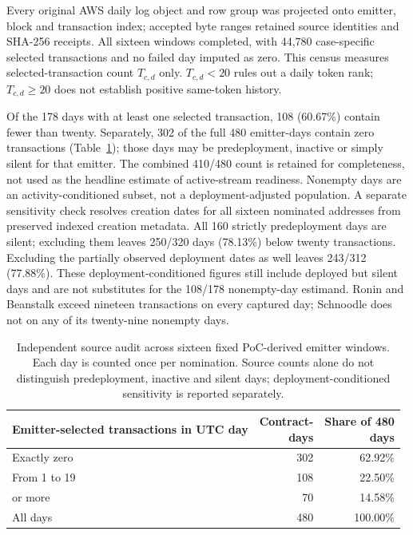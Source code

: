 \documentclass[preprint,12pt,authoryear]{elsarticle}
\begin{document}
Every original AWS daily log object and row group was projected onto emitter, block and transaction index; accepted byte ranges retained source identities and SHA-256 receipts. All sixteen windows completed, with 44,780 case-specific selected transactions and no failed day imputed as zero. This census measures selected-transaction count $T_{c,d}$ only. $T_{c,d}<20$ rules out a daily token rank; $T_{c,d}\geq20$ does not establish positive same-token history.

Of the 178 days with at least one selected transaction, 108 (60.67\%) contain fewer than twenty. Separately, 302 of the full 480 emitter-days contain zero transactions (Table~\ref{tab:newframe}); those days may be predeployment, inactive or simply silent for that emitter. The combined 410/480 count is retained for completeness, not used as the headline estimate of active-stream readiness. Nonempty days are an activity-conditioned subset, not a deployment-adjusted population. A separate sensitivity check resolves creation dates for all sixteen nominated addresses from preserved indexed creation metadata. All 160 strictly predeployment days are silent; excluding them leaves 250/320 days (78.13\%) below twenty transactions. Excluding the partially observed deployment dates as well leaves 243/312 (77.88\%). These deployment-conditioned figures still include deployed but silent days and are not substitutes for the 108/178 nonempty-day estimand. Ronin and Beanstalk exceed nineteen transactions on every captured day; Schnoodle does not on any of its twenty-nine nonempty days.

\begin{table}[htbp]
\centering\small
\caption{Independent source audit across sixteen fixed PoC-derived emitter windows. Each day is counted once per nomination. Source counts alone do not distinguish predeployment, inactive and silent days; deployment-conditioned sensitivity is reported separately.}
\label{tab:newframe}
\begin{tabularx}{\linewidth}{@{}>{\raggedright\arraybackslash}X r r@{}}
\toprule
Emitter-selected transactions in UTC day & \shortstack{Contract-\\days} & \shortstack{Share of 480\\days}\\
\midrule
Exactly zero & 302 & 62.92\%\\
From 1 to 19 & 108 & 22.50\%\\
20 or more & 70 & 14.58\%\\
\midrule
All days & 480 & 100.00\%\\
\bottomrule
\end{tabularx}
\end{table}
\end{document}
